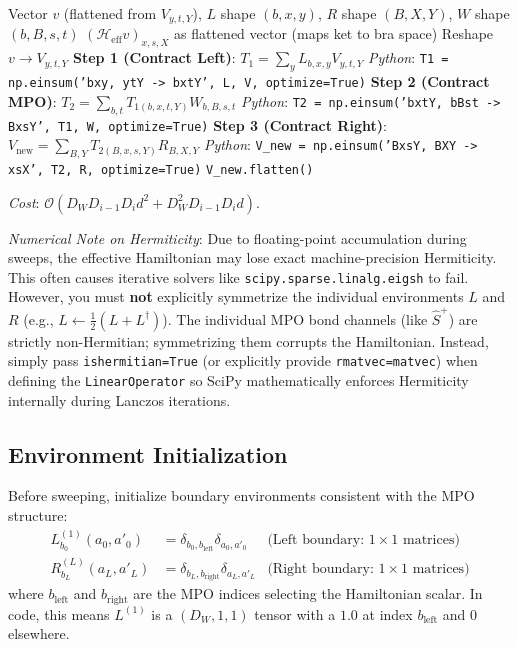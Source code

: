\documentclass[aps,prb,onecolumn,scriptaddress]{revtex4-2}
\newcommand{\Order}{\mathcal{O}}
\begin{document}
	\begin{algorithm}[H]
		\caption{ApplyEffectiveHamiltonian (Matrix-Free)}
		\begin{algorithmic}[1]
			\Require Vector $v$ (flattened from $V_{y,t,Y}$), $L$ shape $(b, x, y)$, $R$ shape $(B, X, Y)$, $W$ shape $(b, B, s, t)$
			\Ensure $(\mathcal{H}_{\text{eff}}v)_{x,s,X}$ as flattened vector (maps ket to bra space)
			\State Reshape $v \to V_{y,t,Y}$ 
			\State \textbf{Step 1 (Contract Left)}: $T_1 = \sum_{y} L_{b, x, y} V_{y, t, Y}$
			\State {} \textit{Python}: \texttt{T1 = np.einsum('bxy, ytY -> bxtY', L, V, optimize=True)}
			\State \textbf{Step 2 (Contract MPO)}: $T_2 = \sum_{b, t} T_{1(b, x, t, Y)} W_{b, B, s, t}$  
			\State {} \textit{Python}: \texttt{T2 = np.einsum('bxtY, bBst -> BxsY', T1, W, optimize=True)} 
			\State \textbf{Step 3 (Contract Right)}: $V_{\text{new}} = \sum_{B, Y} T_{2(B, x, s, Y)} R_{B, X, Y}$
			\State {} \textit{Python}: \texttt{V\_new = np.einsum('BxsY, BXY -> xsX', T2, R, optimize=True)} 
			\State \Return \texttt{V\_new.flatten()} 
		\end{algorithmic}
	\end{algorithm}
	\textit{Cost}: $\Order(D_W D_{i-1} D_i d^2 + D_W^2 D_{i-1} D_i d)$. 
	
	\textit{Numerical Note on Hermiticity}: Due to floating-point accumulation during sweeps, the effective Hamiltonian may lose exact machine-precision Hermiticity. This often causes iterative solvers like \texttt{scipy.sparse.linalg.eigsh} to fail. However, you must \textbf{not} explicitly symmetrize the individual environments $L$ and $R$ (e.g., $L \gets \frac{1}{2}(L + L^\dagger)$). The individual MPO bond channels (like $\hat{S}^+$) are strictly non-Hermitian; symmetrizing them corrupts the Hamiltonian. Instead, simply pass \texttt{ishermitian=True} (or explicitly provide \texttt{rmatvec=matvec}) when defining the \texttt{LinearOperator} so SciPy mathematically enforces Hermiticity internally during Lanczos iterations.
	
	\subsection{Environment Initialization}
	Before sweeping, initialize boundary environments consistent with the MPO structure:
	\begin{align}
		L^{(1)}_{b_0}(a_0, a'_0) &= \delta_{b_0, b_{\text{left}}} \delta_{a_0, a'_0} & \text{(Left boundary: $1 \times 1$ matrices)} \\
		R^{(L)}_{b_L}(a_L, a'_L) &= \delta_{b_L, b_{\text{right}}} \delta_{a_L, a'_L} & \text{(Right boundary: $1 \times 1$ matrices)}
	\end{align}
	where $b_{\text{left}}$ and $b_{\text{right}}$ are the MPO indices selecting the Hamiltonian scalar. In code, this means $L^{(1)}$ is a $(D_W, 1, 1)$ tensor with a $1.0$ at index $b_{\text{left}}$ and $0$ elsewhere.
	
\end{document}
